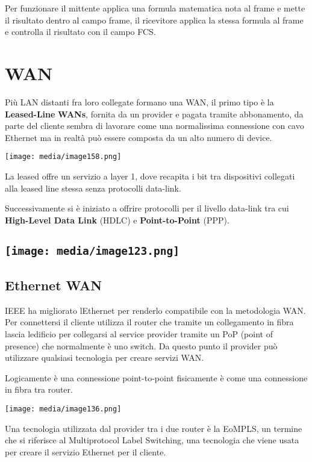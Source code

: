 Per funzionare il mittente applica una formula matematica nota al frame
e mette il risultato dentro al campo frame, il ricevitore applica la
stessa formula al frame e controlla il risultato con il campo FCS.

\section{WAN}\label{wan}

Più LAN distanti fra loro collegate formano una WAN, il primo tipo è la
\textbf{Leased-Line} \textbf{WANs}, fornita da un provider e pagata
tramite abbonamento, da parte del cliente sembra di lavorare come una
normalissima connessione con cavo Ethernet ma in realtà può essere
composta da un alto numero di device.

\texttt{[image: media/image158.png]}

La leased offre un servizio a layer 1, dove recapita i bit tra
dispositivi collegati alla leased line stessa senza protocolli
data-link.

Successivamente si è iniziato a offrire protocolli per il livello
data-link tra cui \textbf{High-Level Data Link} (HDLC) e
\textbf{Point-to-Point} (PPP).

\subsection{\texorpdfstring{\protect\texttt{[image: media/image123.png]}}{}}\label{section}

\subsection{Ethernet WAN}\label{ethernet-wan}

IEEE ha migliorato l\textquotesingle Ethernet per renderlo compatibile
con la metodologia WAN. Per connettersi il cliente utilizza il router
che tramite un collegamento in fibra lascia l\textquotesingle edificio
per collegarsi al service provider tramite un PoP (point of presence)
che normalmente è uno switch. Da questo punto il provider può utilizzare
qualsiasi tecnologia per creare servizi WAN.

Logicamente è una connessione point-to-point fisicamente è come una
connessione in fibra tra router.

\texttt{[image: media/image136.png]}

Una tecnologia utilizzata dal provider tra i due router è la EoMPLS, un
termine che si riferisce al Multiprotocol Label Switching, una
tecnologia che viene usata per creare il servizio Ethernet per il
cliente.

